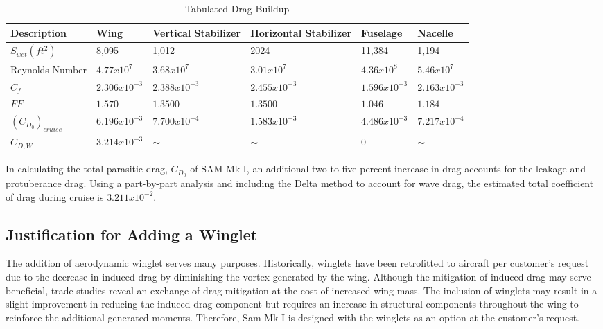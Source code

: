 \begin{table}[!h]
    \centering
    \caption{Tabulated Drag Buildup}
    \begin{tabular}{|p{0.75in}||p{0.75in}|p{0.75in}|p{0.75in}|p{0.75in}|p{0.75in}|}\toprule
        \textbf{Description} & \textbf{Wing} & \textbf{Vertical \newline Stabilizer} & \textbf{Horizontal \newline Stabilizer} & \textbf{Fuselage} & \textbf{Nacelle}  \\ \hline \hline
        $S_{wet} (ft^2)$ & 8,095 & 1,012 & 2024 & 11,384 & 1,194 \\ \hline
        Reynolds Number & $4.77x10^7$ & $3.68x10^7$ & $3.01x10^7$ & $4.36 x 10^8$ & $5.46 x 10^7$ \\ \hline
        $C_{f}$ & $2.306 x 10^{-3}$ & $2.388 x 10^{-3}$ & $2.455 x 10^{-3}$ & $1.596 x 10^{-3}$ & $2.163 x 10^{-3}$ \\ \hline
        $FF$ & $1.570$ & $1.3500$ & $1.3500$ & $1.046$ & $1.184$ \\ \hline
        \textbf{$(C_{D_{0}})_{cruise}$} & $6.196 x 10^{-3}$ & $7.700 x 10^{-4}$ & $1.583 x 10^{-3}$ & $4.486 x 10^{-3}$ & $7.217x10^{-4}$ \\ \midrule
        \textbf{$C_{D,W}$} & $3.214 x 10^{-3}$ & $\sim$ & $\sim$ & 0 & $\sim$ \\ \bottomrule
    \end{tabular}
    \label{tab:dragbuildup}
\end{table}

In calculating the total parasitic drag, $C_{D_{0}}$ of SAM Mk I, an additional two to five percent increase in drag accounts for the leakage and protuberance drag. \cite{raymer}  Using a part-by-part analysis and including the Delta method to account for wave drag, the estimated total coefficient of drag during cruise is $3.211 x 10^{-2}$.

\subsection{Justification for Adding a Winglet}
The addition of aerodynamic winglet serves many purposes.  Historically, winglets have been retrofitted to aircraft per customer's request due to the decrease in induced drag by diminishing the vortex generated by the wing\cite{winglets}.  Although the mitigation of induced drag may serve beneficial, trade studies reveal an exchange of drag mitigation at the cost of increased wing mass.  The inclusion of winglets may result in a slight improvement in reducing the induced drag component but requires an increase in structural components throughout the wing to reinforce the additional generated moments.  Therefore, Sam Mk I is designed with the winglets as an option at the customer's request.


